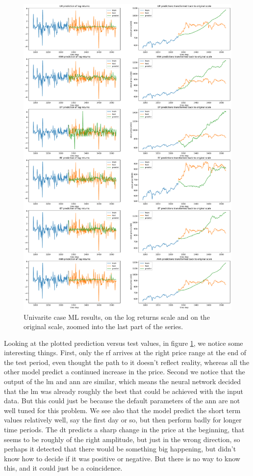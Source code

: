 \begin{figure}
	\centering
	\includegraphics[width=\textwidth]{img/img_mlresults_basic.pdf}
	\caption{Univarite case ML results, on the log returns scale and on the original scale, zoomed into the last part of the series.}
	\label{fig:mlresults_basic}
\end{figure}

Looking at the plotted prediction versus test values, in figure \ref{fig:mlresults_basic}, we notice some interesting things. First, only the \acrshort{rf} arrives at the right price range at the end of the test period, even thought the path to it doesn't reflect reality, whereas all the other model predict a continued increase in the price. Second we notice that the output of the \acrshort{lm} and \acrshort{ann} are similar, which means the neural network decided that the \acrlong{lm} was already roughly the best that could be achieved with the input data. But this could just be because the default parameters of the \acrshort{ann} are not well tuned for this problem. We see also that the model predict the short term values relatively well, say the first day or so, but then perform badly for longer time periods.
The \acrshort{dt} predicts a sharp change in the price at the beginning, that seems to be roughly of the right amplitude, but just in the wrong direction, so perhaps it detected that there would be something big happening, but didn't know how to decide if it was positive or negative. But there is no way to know this, and it could just be a coincidence.

